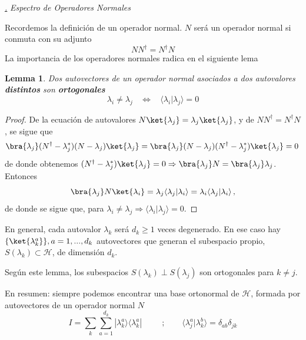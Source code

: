 \documentclass[a4paper,11pt]{book} %
\newtheorem{lemma_contador}{Lemma}
\newcommand{\Lemma}[1]{
		\begin{mybox_gray2}{}
			\begin{lemma_contador}
				 #1 
			\end{lemma_contador} 
		\end{mybox_gray2}
	}
\numberwithin{equation}{chapter}
\newcommand{\braket}[2]{\langle #1|#2\rangle}
\newcommand{\ketbra}[2]{| #1\rangle \! \langle #2|}
\def\subsubiContadorIt{\par\addtocounter{subsubsection}{1}\underline{\it\thesubsubsection.}\hskip0.5cm \setcounter{subsubsubsectionIt}{0}}
\newcommand{\SubsubiIt}[1]{
		\subsubiContadorIt \textit{#1}
	}
\newcounter{subsubsubsectionIt}[subsubsection]
\begin{document}
			\SubsubiIt{Espectro de Operadores Normales}

Recordemos la definición de un operador normal. $N$ será un operador normal si conmuta con su adjunto
\begin{equation}
NN^\dagger = N^\dagger N
\end{equation}
La importancia de los operadores normales radica en el siguiente lema     

	\Lemma{
	Dos autovectores de un operador normal asociados a dos autovalores \textbf{distintos}  son \textbf{ortogonales}
	\begin{equation}
\lambda_i\neq \lambda_j~~~~\Longleftrightarrow ~~~~ \braket{\lambda_i}{\lambda_j} = 0
\end{equation}
	}

\begin{proof}
De la ecuación de autovalores $N\ket{\lambda_j} =  \lambda_j \ket{\lambda_j}$, y de $NN^\dagger = N^\dagger N$, se sigue que
\begin{equation}
\bra{\lambda_j}(N^\dagger - \lambda_j^*)(N - \lambda_j) \ket{\lambda_j} = \bra{\lambda_j}(N - \lambda_j)(N^\dagger - \lambda_j^*) \ket{\lambda_j}  = 0\,
\end{equation}
 de donde obtenemos $(N^\dagger - \lambda_j^*) \ket{\lambda_j} = 0 \Rightarrow \bra{\lambda_j} N = \bra{\lambda_j}\lambda_j$. Entonces
\begin{equation}
\bra{\lambda_j}N\ket{\lambda_i} = \lambda_j \braket{\lambda_j}{\lambda_i} = \lambda_i \braket{\lambda_j}{\lambda_i} \, ,
\end{equation}
de donde se sigue que, para $\lambda_i \neq \lambda_j \Rightarrow \braket{\lambda_i}{\lambda_j} = 0$. 
\end{proof}

En general, cada autovalor $\lambda_k$ será $d_k \geq 1$ veces degenerado. En ese caso hay  $\{\ket{\lambda^a_k}\}, a=1,...,d_k$ autovectores que generan el subespacio propio, $S(\lambda_k)\subset \mathcal{H} $, de dimensión $d_k$. 

Según este lemma, los subespacios $S(\lambda_k)\perp S(\lambda_j)$ son ortogonales para $k\neq j$. 

En resumen: siempre podemos encontrar una base  ortonormal de $\mathcal{H}$, formada por autovectores de un operador normal $N$
\begin{equation}
I = \sum_k\sum_{a=1}^{d_k} \ketbra{\lambda^a_k}{\lambda^a_k} ~~~~~~~~~~~;~~~~~~~~~ \braket{\lambda^a_j}{\lambda^b_k} = \delta_{ab}\delta_{jk}
\end{equation}
\end{document}

